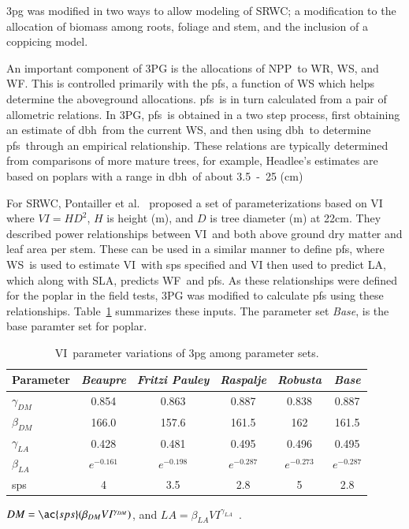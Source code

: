 \documentclass[preprint,12pt]{elsarticle}
\begin{document}
\ac{3pg} was modified in two ways to allow modeling of \ac{SRWC}; a
modification to the allocation of biomass among roots, foliage and
stem, and the inclusion of a coppicing model.

An important component of 3PG is the allocations of \ac{NPP}~to
\ac{WR}, \ac{WS}, and \ac{WF}.  This is controlled primarily with the
\ac{pfs}, a function of \ac{WS} which helps determine the aboveground
allocations.  \ac{pfs}~is in turn calculated from a pair of allometric
relations.  In 3PG, \ac{pfs}~is obtained in a two step process, first
obtaining an estimate of \ac{dbh}~from the current \ac{WS}, and then
using \ac{dbh}~to determine \ac{pfs}~through an empirical
relationship.  These relations are typically determined from
comparisons of more mature trees, for example, Headlee's estimates are
based on poplars with a range in \ac{dbh}~of about 3.5~-~25
(cm)~\cite{Headlee2012}%

For \ac{SRWC}, Pontailler et al.~\cite{pontailler97-volume-index}
proposed a set of parameterizations based on \ac{VI} where $VI =
HD^2$, $H$ is height (m), and $D$ is tree diameter (m) at 22cm.  They
described power relationships between \ac{VI}~and both above ground
dry matter and leaf area per stem. These can be used in a similar
manner to define \ac{pfs}, where \ac{WS}~is used to estimate
\ac{VI}~with \ac{sps} specified and \ac{VI} then used to predict
\ac{LA}, which along with \ac{SLA}, predicts \ac{WF}~and \ac{pfs}. As
these relationships were defined for the poplar in the field tests,
\ac{3PG} was modified to calculate \ac{pfs} using these relationships.
Table~\ref{tab:pont-3pg} summarizes these inputs.  The parameter set
\emph{Base}, is the base paramter set for poplar.

\begin{table}%
  \caption{\acf{VI}~parameter variations of \ac{3pg} among parameter sets.}
  \begin{tabular}{|lccccc|}
    \hline
    Parameter & \emph{Beaupre} & \emph{Fritzi Pauley} & \emph{Raspalje} & \emph{Robusta} & \emph{Base}\\
    \hline
    $\gamma_{DM}$ &  0.854 & 0.863 & 0.887 & 0.838 & 0.887\\
    $\beta_{DM}$  & 166.0 & 157.6 & 161.5 & 162 & 161.5\\
    $\gamma_{LA}$ &  0.428 &  0.481 & 0.495 & 0.496 & 0.495\\ 
    $\beta_{LA}$ & $e^{-0.161}$ & $e^{-0.198}$ & $e^{-0.287}$ & $e^{-0.273}$ & $e^{-0.287}$\\
    \ac{sps} & 4 & 3.5 & 2.8 & 5 & 2.8\\
    \hline 
  \end{tabular}
  \begin{flushleft}$DM=\ac{sps}(\beta_{DM} VI^{\gamma_{DM}})$, and $LA = \beta_{LA} VI^{\gamma_{LA}}$~\cite{pontailler97-volume-index}.
\end{flushleft}  
\label{tab:pont-3pg}
\end{table}
\end{document}

